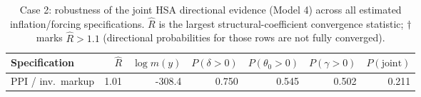 \begin{table}[H]\centering\small
\caption{Case 2: robustness of the joint HSA directional evidence (Model 4) across all estimated inflation/forcing specifications. $\hat R$ is the largest structural-coefficient convergence statistic; $\dagger$ marks $\hat R>1.1$ (directional probabilities for those rows are not fully converged).}
\label{tab:case2_robust}
\footnotesize\setlength{\tabcolsep}{4.5pt}
\begin{tabular}{@{}lrrrrrr@{}}\toprule
Specification & $\hat R$ & $\log m(y)$ & $P(\delta{>}0)$ & $P(\theta_0{>}0)$ & $P(\gamma{>}0)$ & $P(\text{joint})$ \\\midrule
PPI / inv.\ markup & 1.01 & -308.4 & 0.750 & 0.545 & 0.502 & 0.211 \\
\bottomrule\end{tabular}\end{table}
